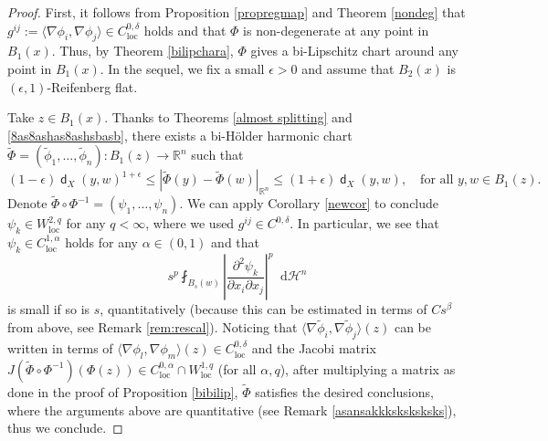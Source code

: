 \documentclass[11pt,reqno]{amsart}
\theoremstyle{definition}
\numberwithin{equation}{section}
\newcommand{\di}{\mathop{}\!\mathrm{d}}
\DeclareMathOperator{\dist}{\mathsf{d}}
\DeclareMathOperator{\loc}{loc}
\newcommand{\haus}{\mathscr{H}}
\begin{document}
\begin{proof}
First, it follows from Proposition \ref{propregmap} and Theorem \ref{nondeg} that $g^{ij}:=\langle \nabla\phi_i, \nabla \phi_j\rangle \in C^{0,\delta}_{\loc}$ holds and that $\Phi$ is non-degenerate at any point in $B_{1}(x)$. Thus, by Theorem \ref{bilipchara}, $\Phi$ gives a bi-Lipschitz chart around any point in $B_{1}(x)$.  
In the sequel, we fix a small $\epsilon>0$ and assume that $B_2(x)$ is $(\epsilon, 1)$-Reifenberg flat.


Take $z \in B_{1}(x)$.
Thanks to Theorems \ref{almost splitting} and \ref{8as8ashas8ashsbasb},  there exists a bi-H\"older harmonic chart $\tilde \Phi=(\tilde \phi_1, \ldots, \tilde \phi_n):B_{1}(z) \to \mathbb{R}^n$ such that 
    \begin{equation}
        (1-\epsilon)\dist_X(y,w)^{1+\epsilon} \le |\tilde \Phi(y)-\tilde \Phi(w)|_{\mathbb{R}^n}\le (1+\epsilon)\dist_X(y,w),\quad \text{for all $y, w \in B_{1}(z)$}.
    \end{equation}
    Denote $\tilde \Phi \circ \Phi^{-1}=(\psi_1, \ldots, \psi_n)$. We can apply Corollary \ref{newcor} to conclude
$\psi_k \in W^{2, q}_{\loc}$ for any $q<\infty$, where we used $g^{ij} \in C^{0,\delta}$. In particular, we see that $\psi_k \in C^{1, \alpha}_{\loc}$ holds for any $\alpha \in (0, 1)$ and that 
\begin{equation}
    s^p\fint_{B_s(w)}\left|\frac{\partial^2\psi_k}{\partial x_i\partial x_j}\right|^p\di \haus^n 
\end{equation}
is small if so is $s$, quantitatively (because this can be estimated in terms of $Cs^{\beta}$ from above, see Remark \ref{rem:rescal}). 
Noticing that  $\langle \nabla \tilde \phi_i, \nabla \tilde \phi_j\rangle (z)$ can be written in terms of $\langle \nabla \phi_l, \nabla \phi_m\rangle (z) \in C^{0,\delta}_{\loc}$ and the Jacobi matrix $J(\tilde \Phi \circ \Phi^{-1})(\Phi(z)) \in C^{0,\alpha}_{\loc}\cap W^{1,q}_{\loc}$ (for all $\alpha, q$),
after multiplying a matrix as done in the proof of Proposition \ref{bibilip}, $\tilde \Phi$ satisfies the desired conclusions, where the arguments above are quantitative (see Remark \ref{asansakkksksksksks}), thus we conclude.
\end{proof}
\end{document}
